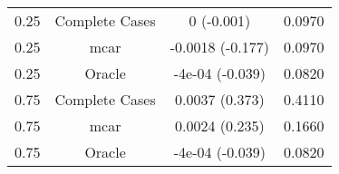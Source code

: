 \begin{table}[ht]
\centering
\begin{tabular}{cccc}
  \hline
  \hline
0.25 & Complete Cases & 0 (-0.001) & 0.0970 \\ 
  0.25 & mcar & -0.0018 (-0.177) & 0.0970 \\ 
  0.25 & Oracle & -4e-04 (-0.039) & 0.0820 \\ 
  0.75 & Complete Cases & 0.0037 (0.373) & 0.4110 \\ 
  0.75 & mcar & 0.0024 (0.235) & 0.1660 \\ 
  0.75 & Oracle & -4e-04 (-0.039) & 0.0820 \\ 
   \hline
\end{tabular}
\end{table}
